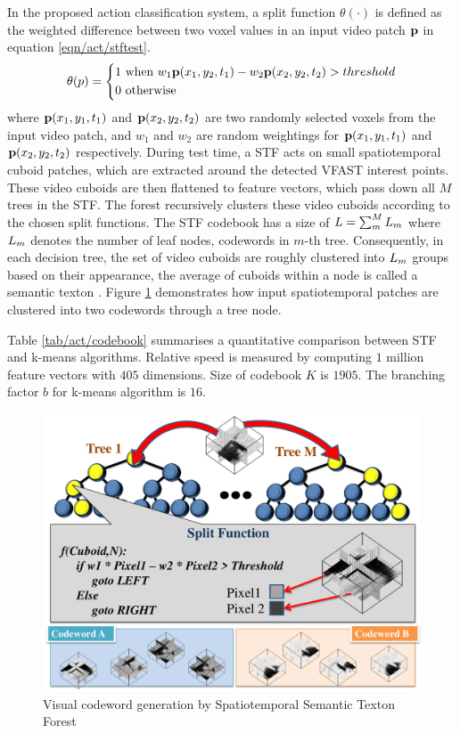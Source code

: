 In the proposed action classification system, a split function $\theta(\cdot)$ is defined as the weighted difference between two voxel values in an input video patch $\mathbf{p}$ in equation \ref{eqn/act/stftest}. 
\begin{equation}
	\theta(p) = 
	\left\{
		\begin{aligned}
			1 & \mbox{ when } w_1 \mathbf{p}(x_1,y_2,t_1) - w_2 \mathbf{p}(x_2,y_2,t_2) > threshold \\  
			0 & \mbox{ otherwise } 
		\end{aligned}
	\right.
	\label{eqn/act/stftest}
\end{equation}
where $\mathbf{p}(x_1, y_1, t_1)$ and $\mathbf{p}(x_2, y_2, t_2)$ are two randomly selected voxels from the input video patch, and $w_1$ and $w_2$ are random weightings for $\mathbf{p}(x_1,y_1,t_1)$ and $\mathbf{p}(x_2,y_2,t_2)$ respectively. 
During test time, a STF acts on small spatiotemporal cuboid patches, which are extracted around the detected VFAST interest points. These video cuboids are then flattened to feature vectors, which pass down all $M$ trees in the STF. 
The forest recursively clusters these video cuboids according to the chosen split functions.  
The STF codebook has a size of $L=\sum_m^M L_m$ where $L_m$ denotes the number of leaf nodes, \ie codewords in $m$-th tree. 
Consequently, in each decision tree, the set of video cuboids are roughly clustered into $L_m$ groups based on their appearance, the average of cuboids within a node is called a semantic texton \cite{Shotton2008}. 
Figure \ref{fig/act/stf} demonstrates how input spatiotemporal patches are clustered into two codewords through a tree node. 

Table \ref{tab/act/codebook} summarises a quantitative comparison between STF and k-means algorithms. Relative speed is measured by computing $1$ million feature vectors with $405$ dimensions. Size of codebook $K$ is $1905$. The branching factor $b$ for k-means algorithm is $16$.

\begin{figure}[ht]
	\centering 
	\includegraphics[width=0.8\linewidth]{fig/act/stf_new.pdf} 
	\caption{Visual codeword generation by Spatiotemporal Semantic Texton Forest}
	\label{fig/act/stf}
\end{figure}

